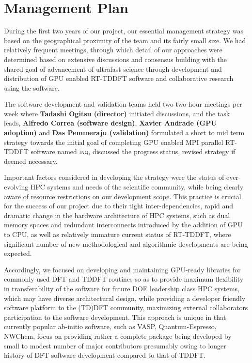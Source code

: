 \section{Management Plan}
\label{sec:manage}

During the first two years of our project, our essential management strategy was based on the geographical proximity of the team and its fairly small size. We had relatively frequent meetings, through which detail of our approaches were determined based on extensive discussions and consensus building with the shared goal of advancement of ultrafast science through development and distribution of GPU enabled RT-TDDFT software and collaborative research using the software. 

The software development and validation teams held two two-hour meetings per week where {\bf Tadashi Ogitsu (director)} initiated discussions, and the task leads, {\bf Alfredo Correa (software design)}, {\bf Xavier Andrade (GPU adoption)} and {\bf Das Pemmeraju (validation)} formulated a short to mid term strategy towards the initial goal of completing GPU enabled MPI parallel RT-TDDFT software named \textsc{inq}, discussed the progress status, revised strategy if deemed necessary.

Important factors considered in developing the strategy were the status of ever-evolving HPC systems and needs of the scientific community, while being clearly aware of resource restrictions on our development scope. 
This practice is crucial for the success of our project due to their tight inter-dependencies, rapid and dramatic change in the hardware architecture of HPC systems, such as dual memory spaces and redundant interconnects introduced by the addition of GPU to CPU, as well as relatively immature current status of RT-TDDFT, where significant number of new methodological and algorithmic developments are being expected. 

Accordingly, we focused on developing and maintaining GPU-ready libraries for commonly used DFT and TDDFT routines so as to provide maximum flexibility in transferability of the software for future DOE leadership class HPC systems, which may have diverse architectural design, while providing a developer friendly software platform to the (TD)DFT community, maximizing external collaborators participation to the software development. 
This approach is unique in that currently popular ab-initio software, such as VASP, Quantum-Espresso, NWChem, focus on providing rather a complete package being developed by small to modest number of major contributors presumably owing to longer history of DFT software development compared to that of TDDFT.

